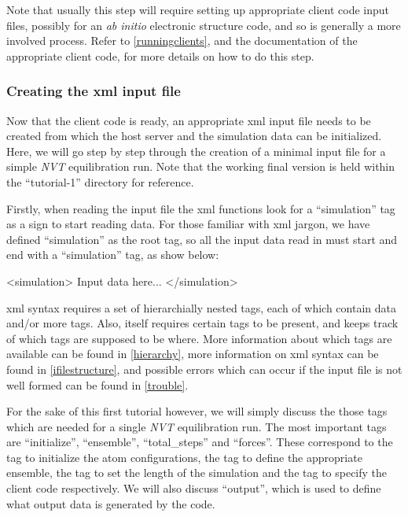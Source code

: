 \documentclass[11pt,english,fleqn]{report}
\newenvironment{code}{%
\footnotesize 
\verbatim
}{
\endverbatim
\normalsize
}
\begin{document}
Note that usually this step will require setting up appropriate
client code input files, possibly for an \emph{ab initio} electronic
structure code, and so is generally a more involved process. Refer
to \ref{runningclients}, and the documentation of the appropriate
client code, for more details on how to do this step.


\subsubsection{Creating the xml input file}

Now that the client code is ready, an appropriate xml input file needs
to be created from which the host server and the simulation data can
be initialized. Here, we will go step by step through the creation
of a minimal input file for a simple \emph{NVT} equilibration run. Note that
the working final version is held within the {}``tutorial-1'' directory
for reference.

Firstly, when reading the input file the \ipi xml functions look
for a {}``simulation''
tag as a sign to start reading data. For those familiar with xml jargon,
we have defined {}``simulation'' as the root tag, so all the input
data read in must start and end with a {}``simulation'' tag, as
show below:

\begin{code}
<simulation>
   Input data here...
</simulation>
\end{code}

xml syntax requires a set of hierarchially nested tags, each of which
contain data and/or more tags. Also, \ipi itself requires certain
tags to be present, and keeps track of which tags are supposed to
be where. More information about which tags are available can be found
in \ref{hierarchy}, more information on xml syntax can be found in
\ref{ifilestructure}, and possible errors which can occur if the
input file is not well formed can be found in \ref{trouble}. 

For the sake of this first tutorial however, we will simply discuss the
those tags which are needed for a single \emph{NVT} equilibration run.
The most important tags are {}``initialize'', {}``ensemble'', 
{}``total\_steps'' and {}``forces''.
These correspond to the tag to initialize the atom configurations,
the tag to define the appropriate ensemble,
the tag to set the length of the simulation and the tag to specify the client code
respectively.
We will also discuss {}``output'', which is used to define what output data
is generated by the code.
\end{document}
